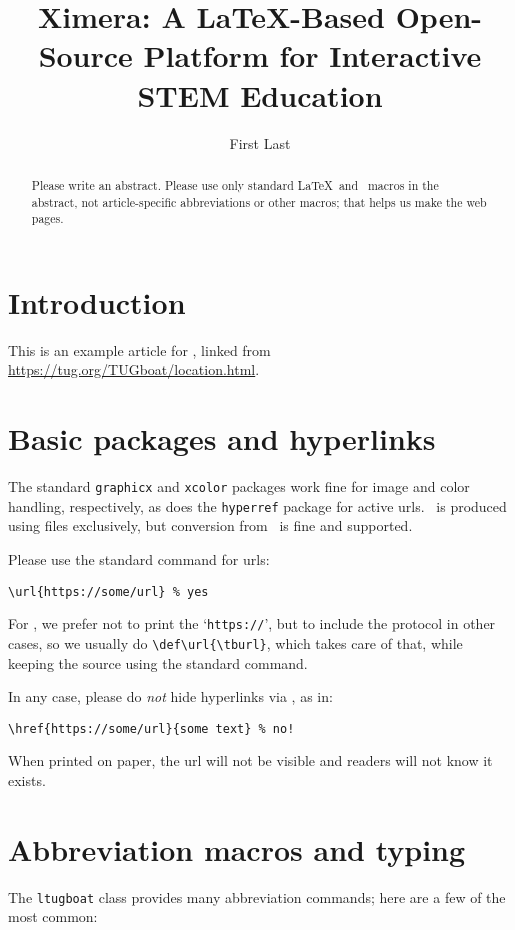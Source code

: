 \documentclass{ltugboat}
\title{Ximera: A \LaTeX-Based Open-Source Platform for Interactive STEM Education}
\author{First Last}
\begin{document}
\maketitle

\begin{abstract}
Please write an abstract. Please use only standard \LaTeX\ and \TUB\
macros in the abstract, not article-specific abbreviations or other
macros; that helps us make the web pages.
\end{abstract}

\section{Introduction}

This is an example article for \TUB, linked from
\url{https://tug.org/TUGboat/location.html}.

\section{Basic packages and hyperlinks}

The standard \texttt{graphicx} and \texttt{xcolor} packages work fine
for image and color handling, respectively, as does the
\texttt{hyperref} package for active urls. \TUB\ is produced using
\acro{PDF} files exclusively, but conversion from \DVI\ is fine and supported.

Please use the standard  command for urls:
\begin{verbatim}
\url{https://some/url} % yes
\end{verbatim}
For \TUB, we prefer not to print the `\texttt{https://}', but to include
the protocol in other cases, so we usually do \verb|\def\url{\tburl}|,
which takes care of that, while keeping the source using the standard
\cs{url} command.

In any case, please do \emph{not} hide hyperlinks via , as in:
\begin{verbatim}
\href{https://some/url}{some text} % no!
\end{verbatim}
When printed on paper, the url will not be visible and readers will
not know it exists.

\section{Abbreviation macros and typing}

The \texttt{ltugboat} class provides many abbreviation commands; here
are a few of the most common:
\end{document}
